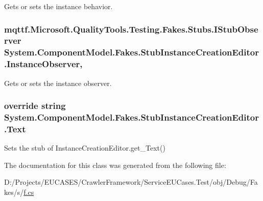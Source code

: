 Gets or sets the instance behavior.

\hypertarget{class_system_1_1_component_model_1_1_fakes_1_1_stub_instance_creation_editor_a391ff7dbb12faf1d1ab6a94ad10287f4}{
\subsubsection[{Instance\-Observer}]{\setlength{\rightskip}{0pt plus 5cm}mqttf.\-Microsoft.\-Quality\-Tools.\-Testing.\-Fakes.\-Stubs.\-I\-Stub\-Observer System.\-Component\-Model.\-Fakes.\-Stub\-Instance\-Creation\-Editor.\-Instance\-Observer\hspace{0.3cm}{\ttfamily [get]}, {\ttfamily [set]}}}\label{class_system_1_1_component_model_1_1_fakes_1_1_stub_instance_creation_editor_a391ff7dbb12faf1d1ab6a94ad10287f4}


Gets or sets the instance observer.

\hypertarget{class_system_1_1_component_model_1_1_fakes_1_1_stub_instance_creation_editor_ac0e303c73f458b7d648a1bdfae43ea83}{
\subsubsection[{Text}]{\setlength{\rightskip}{0pt plus 5cm}override string System.\-Component\-Model.\-Fakes.\-Stub\-Instance\-Creation\-Editor.\-Text\hspace{0.3cm}{\ttfamily [get]}}}\label{class_system_1_1_component_model_1_1_fakes_1_1_stub_instance_creation_editor_ac0e303c73f458b7d648a1bdfae43ea83}


Sets the stub of Instance\-Creation\-Editor.\-get\-\_\-\-Text()



The documentation for this class was generated from the following file\-:\begin{DoxyCompactItemize}
\item 
D\-:/\-Projects/\-E\-U\-C\-A\-S\-E\-S/\-Crawler\-Framework/\-Service\-E\-U\-Cases.\-Test/obj/\-Debug/\-Fakes/s/\hyperlink{s_2f_8cs}{f.\-cs}\end{DoxyCompactItemize}
